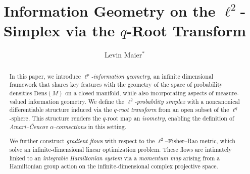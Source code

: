 \documentclass[runningheads]{llncs}
\begin{document}
%
\title{Information Geometry on the $\ell^2$-Simplex via the $q$-Root Transform}
%
%
\author{
	Levin Maier$^{\ast}$
}
\renewcommand{\thefootnote}{\fnsymbol{footnote}}
\renewcommand{\thefootnote}{\arabic{footnote}}
%
%
%
\maketitle              %
%
\begin{abstract}
In this paper, we introduce \emph{$\ell^p$-information geometry}, an infinite dimensional framework that shares key features with the geometry of the space of probability densities \( \mathrm{Dens}(M) \) on a closed manifold, while also incorporating aspects of measure-valued information geometry. We define the \emph{$\ell^2$-probability simplex} with a noncanonical differentiable structure induced via the \emph{$q$-root transform} from an open subset of the $\ell^q$-sphere. This structure renders the $q$-root map an \emph{isometry}, enabling the definition of \emph{Amari--Čencov $\alpha$-connections} in this setting.

We further construct \emph{gradient flows} with respect to the $\ell^2$--Fisher--Rao metric, which solve an infinite-dimensional linear optimization problem. These flows are intimately linked to an \emph{integrable Hamiltonian system} via a \emph{momentum map} arising from a Hamiltonian group action on the infinite-dimensional complex projective space.

\end{abstract}

\end{document}
